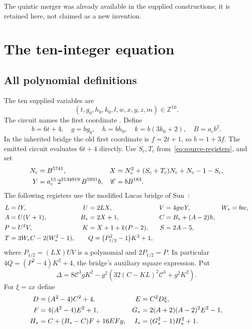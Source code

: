 \documentclass[11pt,a4paper]{article}
\theoremstyle{definition}\newtheorem{definition}[theorem]{Definition}
\theoremstyle{remark}\newtheorem{remark}[theorem]{Remark}
\newcommand{\Z}{\mathbb Z}\newcommand{\N}{\mathbb N}\newcommand{\Pos}{\mathbb Z_{>0}}
\newcommand{\code}[1]{\texttt{\small\detokenize{#1}}}
\begin{document}
The quintic merger was already available in the supplied constructions;
it is retained here, not claimed as a new invention.

\section{The ten-integer equation}\label{sec:ten}

\subsection{All polynomial definitions}

The ten supplied variables are
\[
 (t,g_0,h_0,k_0,l,w,x,y,z,m)\in\Z^{10}.
\]
The circuit names the first coordinate \code{f}. Define
\begin{equation}\label{eq:normalization}
 b=6t+4,\quad g=bg_0,\quad h=bh_0,\quad k=b(3k_0+2),\quad B=a_cb^2.
\end{equation}
In the inherited bridge the old first coordinate is $f=2t+1$, so
$b=1+3f$. The emitted circuit evaluates $6t+4$ directly.
Use $S_c,T_c$ from~\eqref{eq:source-registers}, and set
\begin{align}
 N_c&=B^{5741},&
 X&=N_c^2+(S_c+T_c)N_c+N_c-1-S_c,\notag\\
 Y&=a_c^{15}\,2^{2134919}\,B^{5931}b,&
 \mathscr C&=bB^{183}.\label{eq:ten-source}
\end{align}
The following registers use the modified Lucas bridge of
Sun~\cite{sun2021,sun2026}:
\begin{align}
 L&=lY,& U&=2LX,& V&=4gwY,& W_*&=bw,\notag\\
 A&=U(V+1),& B_*&=2X+1,& C&=B_*+(A-2)h,\notag\\
 P&=U^2V,& K&=X+1+k(P-2),& S&=2A-5,\notag\\
 T&=3W_*C-2(W_*^2-1),&&
 Q=\bigl(P_{1/2}^2-1\bigr)K^2+1,\label{eq:ten-bridge}
\end{align}
where $P_{1/2}=(LX)UV$ is a polynomial and $2P_{1/2}=P$. In particular
$4Q=(P^2-4)K^2+4$, the bridge's auxiliary square expression. Put
\begin{equation}\label{eq:ten-margin}
 \Delta=8\mathscr C^3gK^2
 -g^2\left(32(C-KL)^2\mathscr C^3+g^2K^2\right).
\end{equation}
For $\xi=zx$ define
\begin{align}
 D&=(A^2-4)C^2+4,& E&=C^2D\xi,\notag\\
 F&=4(A^2-4)E^2+1,& G_*&=2(A+2)(A-2)^2E^2-1,\notag\\
 H_*&=C+(B_*-C)F+16EFy,& I_*&=(G_*^2-1)H_*^2+1.
 \label{eq:ten-lucas}
\end{align}
\end{document}
